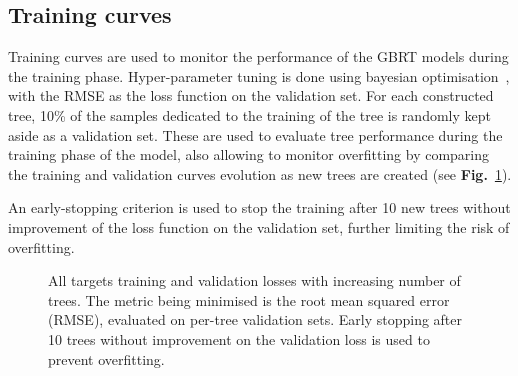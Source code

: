 \subsection{Training curves}
Training curves are used to monitor the performance of the GBRT models during the training phase. Hyper-parameter tuning is done using bayesian optimisation~\cite{Akiba2019}, with the RMSE as the loss function on the validation set. For each constructed tree, 10\% of the samples dedicated to the training of the tree is randomly kept aside as a validation set. These are used to evaluate tree performance during the training phase of the model, also allowing to monitor overfitting by comparing the training and validation curves evolution as new trees are created (see \textbf{Fig.}~\ref{fig:all_losses_curves}). 

An early-stopping criterion is used to stop the training after 10 new trees without improvement of the loss function on the validation set, further limiting the risk of overfitting.
\begin{figure}[h]
\centering
{}
\caption{All targets training and validation losses with increasing number of trees. The metric being minimised is  the root mean squared error (RMSE), evaluated on per-tree validation sets. Early stopping after 10 trees without improvement on the validation loss is used to prevent overfitting.}
\label{fig:all_losses_curves}       %
\end{figure}

